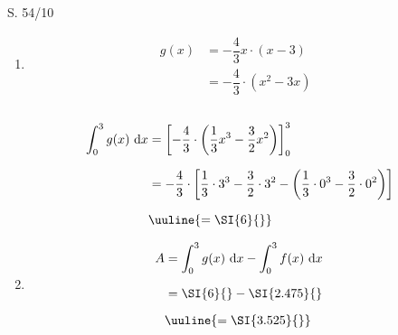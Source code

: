 \begin{Exercise}{S. 54/10}{}
\begin{enumerate}[leftmargin=*]
{\begin{enumerate}[label=\alph*),leftmargin=*]
{\begin{itemize}
                \end{itemize}
                }
            \item [d)] {
                \begin{align*}
                    g(x) &= -\dfrac{4}{3}x \cdot \left(x-3\right) &&\\[1.5ex]
                    &= -\dfrac{4}{3}\cdot \left(x^{2} -3x\right) &&
                \end{align*}\\[-2.0ex]
                \begin{align*}
                    \int_{0}^{3} g(x) \ \mathrm{d}x &= \left[ -\dfrac{4}{3}\cdot \left(\dfrac{1}{3}x^{3} - \dfrac{3}{2}x^{2}\right)\right]_{0}^{3} &&\\[1.5ex]
                    &= -\dfrac{4}{3} \cdot \left[\dfrac{1}{3} \cdot 3^{3} - \dfrac{3}{2} \cdot 3^{2} - \left(\dfrac{1}{3} \cdot 0^{3} - \dfrac{3}{2} \cdot 0^{2}\right)\right]&&\\[1.5ex]
                    &\uuline{= \SI{6}{}} &&
                \end{align*}
                }
            \item [e)] {
                \begin{align*}
                    A &=  \int_{0}^{3} g(x) \ \mathrm{d}x - \int_{0}^{3} f(x) \ \mathrm{d}x &&\\[1.5ex]
                    &= \SI{6}{} - \SI{2.475}{} &&\\[1.5ex]
                    &\uuline{= \SI{3.525}{}} &&
                \end{align*}
            }
        \end{enumerate}
        }
\end{enumerate}
\end{Exercise}
